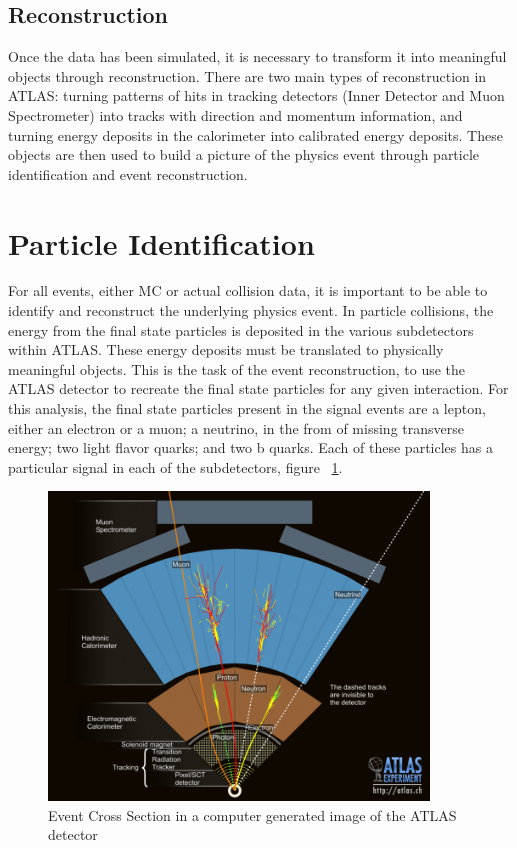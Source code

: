 \subsection{Reconstruction}
Once the data has been simulated, it is necessary to transform it into meaningful objects through reconstruction. There are two main types of reconstruction in ATLAS: turning patterns of hits in tracking detectors (Inner Detector and Muon Spectrometer) into tracks with direction and momentum information, and turning energy deposits in the calorimeter into calibrated energy deposits. These objects are then used to build a picture of the physics event through particle identification and event reconstruction. 
\section{Particle Identification}
For all events, either MC or actual collision data, it is important to be able to identify and reconstruct the underlying physics event. In particle collisions, the energy from the final state particles is deposited in the various subdetectors within ATLAS. These energy deposits must be translated to physically meaningful objects. This is the task of the event reconstruction, to use the ATLAS detector to recreate the final state particles for any given interaction. For this analysis, the final state particles present in the signal events are a lepton, either an electron or a muon; a neutrino, in the from of missing transverse energy; two light flavor quarks; and two b quarks. Each of these particles has a particular signal in each of the subdetectors, figure ~\ref{fig:crossSec}.

\begin{figure}[h]
\begin{center}
\includegraphics*[width=0.90\textwidth] {figures/layers}
\caption[Cartoon showing particle interating in ATLAS detector subsystems]{Event Cross Section in a computer generated image of the ATLAS detector \cite{Pequenao:1096081}}
\label{fig:crossSec}
\end{center}
\end{figure}


